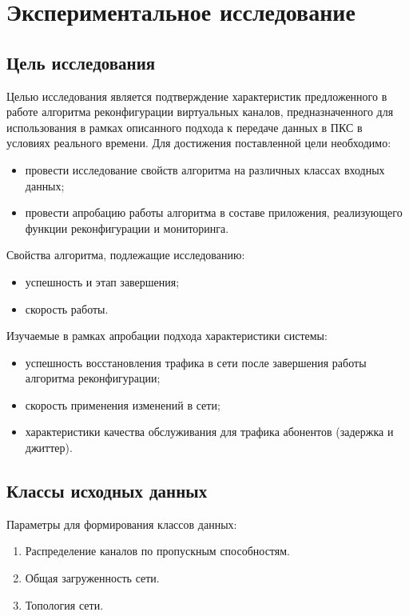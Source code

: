 \documentclass[12pt, a4paper]{article}
\begin{document}
\section{Экспериментальное исследование}
\subsection{Цель исследования}
Целью исследования является подтверждение характеристик предложенного в работе алгоритма реконфигурации виртуальных каналов, предназначенного для использования в рамках описанного подхода к передаче данных в ПКС в условиях реального времени. Для достижения поставленной цели необходимо:
\begin{itemize}
	\item провести исследование свойств алгоритма на различных классах входных данных; 
	\item провести апробацию работы алгоритма в составе приложения, реализующего функции реконфигурации и мониторинга.
\end{itemize}

Свойства алгоритма, подлежащие исследованию:
\begin{itemize}
	\item успешность и этап завершения;
	\item скорость работы.
\end{itemize}

Изучаемые в рамках апробации подхода характеристики системы:
\begin{itemize}
	\item успешность восстановления трафика в сети после завершения работы алгоритма реконфигурации;
	\item скорость применения изменений в сети;
	\item характеристики качества обслуживания для трафика абонентов (задержка и джиттер).
\end{itemize}

\subsection{Классы исходных данных}
Параметры для формирования классов данных:
\begin{enumerate}
	\item Распределение каналов по пропускным способностям.
	\item Общая загруженность сети.
	\item Топология сети.
\end{enumerate}
\end{document}
